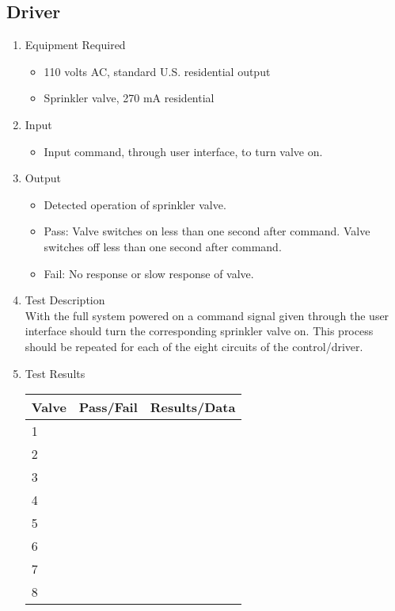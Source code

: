 \documentclass{article}
\begin{document}
\subsection{Driver}

\begin{enumerate}
\item Equipment Required
	\begin{itemize}
	\item 110 volts AC, standard U.S. residential output
	\item Sprinkler valve, 270 mA residential
	\end{itemize}
\item Input
	\begin{itemize}
	\item Input command, through user interface, to turn valve on.
	\end{itemize}
\item Output
	\begin{itemize}
	\item Detected operation of sprinkler valve.
	\item Pass: Valve switches on less than one second after command.
		Valve switches off less than one second after command.
	\item Fail: No response or slow response of valve.
	\end{itemize}
\item Test Description \\

With the full system powered on a command signal
given through the user interface should turn
the corresponding sprinkler valve on.
This process should be repeated for each of the
eight circuits of the control/driver.

\item Test Results \\
	\vspace{0.2in}
	\begin{tabular}{|l|l|l|}
		\hline
		Valve & Pass/Fail & Results/Data\hspace{2in} \\
		\hline
		1 && \\
		\hline
		2 && \\
		\hline
		3 && \\
		\hline
		4 && \\
		\hline
		5 && \\
		\hline
		6 && \\
		\hline
		7 && \\
		\hline
		8 && \\
		\hline
	\end{tabular}
\end{enumerate}
\end{document}
